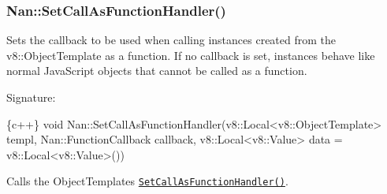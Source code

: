 \label{_api_nan_set_call_as_function_handler}%
 \subsubsection*{Nan\+::\+Set\+Call\+As\+Function\+Handler()}

Sets the callback to be used when calling instances created from the {\ttfamily v8\+::\+Object\+Template} as a function. If no callback is set, instances behave like normal Java\+Script objects that cannot be called as a function.

Signature\+:


\begin{DoxyCode}
\{c++\}
void Nan::SetCallAsFunctionHandler(v8::Local<v8::ObjectTemplate> templ, Nan::FunctionCallback callback,
       v8::Local<v8::Value> data = v8::Local<v8::Value>())
\end{DoxyCode}


Calls the {\ttfamily Object\+Template}\textquotesingle{}s \href{https://v8docs.nodesource.com/io.js-3.0/db/d5f/classv8_1_1_object_template.html#ae0a0e72fb0c5e5f32e255fe5bcc7316a}{\tt {\ttfamily Set\+Call\+As\+Function\+Handler()}}. 